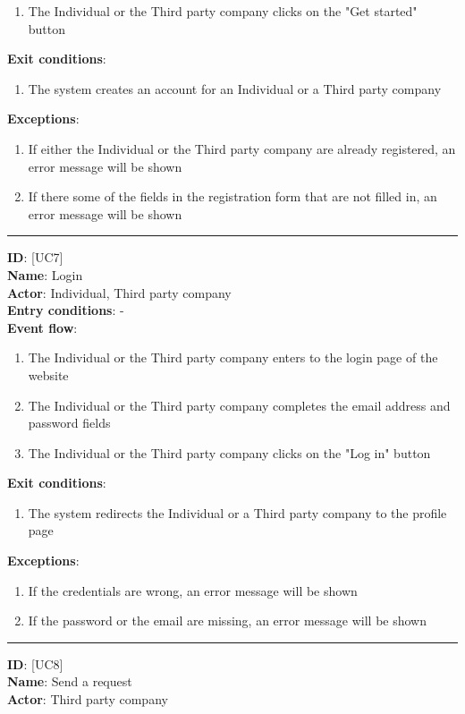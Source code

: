 \documentclass[a4paper, hidelinks, 12pt]{report}
\newcommand\usecase[1]{ [UC#1] }
\begin{document}
\begin{itemize}
\begin{enumerate}
			\item{The Individual or the Third party company clicks on the "Get started" button}
		\end{enumerate}
		\textbf{Exit conditions}:
		\begin{enumerate}
			\item{The system creates an account for an Individual or a Third party company}
		\end{enumerate}
		\textbf{Exceptions}:
		\begin{enumerate}
			\item{If either the Individual or the Third party company are already registered, an error message will be shown}
			\item{If there some of the fields in the registration form that are not filled in, an error message will be shown}
		\end{enumerate}
		\rule{\linewidth}{0.4pt}
		\textbf{ID}: \usecase{7} \\
		\textbf{Name}: Login \\
		\textbf{Actor}: Individual, Third party company \\
		\textbf{Entry conditions}: - \\
		\textbf{Event flow}:
		\begin{enumerate}
			\item{The Individual or the Third party company enters to the login page of the website}
			\item{The Individual or the Third party company completes the email address and password fields}
			\item{The Individual or the Third party company clicks on the "Log in" button}
		\end{enumerate}
		\textbf{Exit conditions}:
		\begin{enumerate}
			\item{The system redirects the Individual or a Third party company to the profile page}
		\end{enumerate}
		\textbf{Exceptions}:
		\begin{enumerate}
			\item{If the credentials are wrong, an error message will be shown}
			\item{If the password or the email are missing, an error message will be shown}
		\end{enumerate}
		\rule{\linewidth}{0.4pt}
		\textbf{ID}: \usecase{8} \\
		\textbf{Name}: Send a request \\
		\textbf{Actor}: Third party company \\

\end{itemize}
\end{document}
